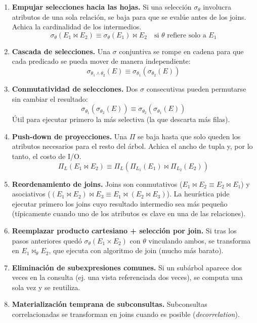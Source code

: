 \documentclass[11pt,a4paper]{article}
\begin{document}
\begin{enumerate}
    \item \textbf{Empujar selecciones hacia las hojas.} Si una selección $\sigma_\theta$ involucra atributos de una sola relación, se baja para que se evalúe antes de los joins. Achica la cardinalidad de los intermedios.
    \[
    \sigma_\theta(E_1 \bowtie E_2) \equiv \sigma_\theta(E_1) \bowtie E_2 \quad \text{si } \theta \text{ refiere solo a } E_1
    \]
    \item \textbf{Cascada de selecciones.} Una $\sigma$ conjuntiva se rompe en cadena para que cada predicado se pueda mover de manera independiente:
    \[
    \sigma_{\theta_1 \wedge \theta_2}(E) \equiv \sigma_{\theta_1}(\sigma_{\theta_2}(E))
    \]
    \item \textbf{Conmutatividad de selecciones.} Dos $\sigma$ consecutivas pueden permutarse sin cambiar el resultado:
    \[
    \sigma_{\theta_1}(\sigma_{\theta_2}(E)) \equiv \sigma_{\theta_2}(\sigma_{\theta_1}(E))
    \]
    Útil para ejecutar primero la más selectiva (la que descarta más filas).
    \item \textbf{Push-down de proyecciones.} Una $\Pi$ se baja hasta que solo queden los atributos necesarios para el resto del árbol. Achica el ancho de tupla y, por lo tanto, el costo de I/O.
    \[
    \Pi_L(E_1 \bowtie E_2) \equiv \Pi_L(\Pi_{L_1}(E_1) \bowtie \Pi_{L_2}(E_2))
    \]
    \item \textbf{Reordenamiento de joins.} Joins son conmutativos ($E_1 \bowtie E_2 \equiv E_2 \bowtie E_1$) y asociativos ($(E_1 \bowtie E_2) \bowtie E_3 \equiv E_1 \bowtie (E_2 \bowtie E_3)$). La heurística pide ejecutar primero los joins cuyo resultado intermedio sea más pequeño (típicamente cuando uno de los atributos es clave en una de las relaciones).
    \item \textbf{Reemplazar producto cartesiano + selección por join.} Si tras los pasos anteriores quedó $\sigma_\theta(E_1 \times E_2)$ con $\theta$ vinculando ambos, se transforma en $E_1 \bowtie_\theta E_2$, que ejecuta con algoritmo de join (mucho más barato).
    \item \textbf{Eliminación de subexpresiones comunes.} Si un subárbol aparece dos veces en la consulta (ej. una vista referenciada dos veces), se computa una sola vez y se reutiliza.
    \item \textbf{Materialización temprana de subconsultas.} Subconsultas correlacionadas se transforman en joins cuando es posible (\emph{decorrelation}).
\end{enumerate}
\end{document}
